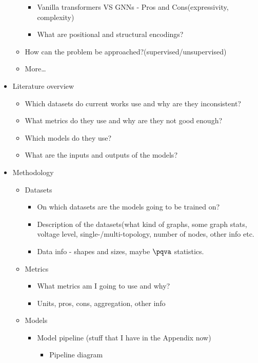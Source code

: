\begin{itemize}
\begin{itemize}
\begin{itemize}
            \item Vanilla transformers VS GNNs - Pros and Cons(expressivity, complexity)
            \item What are positional and structural encodings?
        \end{itemize}
        \item How can the problem be approached?(supervised/unsupervised)
        \item More\ldots
    \end{itemize}
    \item Literature overview
    \begin{itemize}
        \item Which datasets do current works use and why are they inconsistent?
        \item What metrics do they use and why are they not good enough?
        \item Which models do they use?
        \item What are the inputs and outputs of the models?
    \end{itemize}
    \item Methodology
    \begin{itemize}
        \item Datasets
        \begin{itemize}
            \item On which datasets are the models going to be trained on?
            \item Description of the datasets(what kind of graphs, some graph stats, voltage level, single-/multi-topology, number of nodes, other info etc.
            \item Data info - shapes and sizes, maybe $\pqva$ statistics.
        \end{itemize}
        \item Metrics
        \begin{itemize}
            \item What metrics am I going to use and why?
            \item Units, pros, cons, aggregation, other info
        \end{itemize}
        \item Models
        \begin{itemize}
            \item Model pipeline (stuff that I have in the Appendix now)
            \begin{itemize}
                \item Pipeline diagram

\end{itemize}
\end{itemize}
\end{itemize}
\end{itemize}
